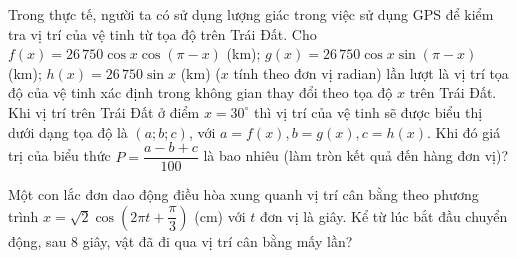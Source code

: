 \begin{bt}%
	Trong thực tế, người ta có sử dụng lượng giác trong việc sử dụng GPS để kiểm tra vị trí của vệ tinh từ tọa độ trên Trái Đất. Cho $ f(x) = 26\,750 \cos x\cos(\pi-x)$ (km); $g(x)=26\,750\cos x\sin(\pi-x)$ (km); $h(x)=26\,750\sin x$ (km) ($x$ tính theo đơn vị radian) lần lượt là vị trí tọa độ của vệ tinh xác định trong không gian thay đổi theo tọa độ $x$ trên Trái Đất. Khi vị trí trên Trái Đất ở điểm $x=30^\circ$ thì vị trí của vệ tinh sẽ được biểu thị dưới dạng tọa độ là $(a;b;c)$, với $a=f(x),b=g(x),c=h(x)$. Khi đó giá trị của biểu thức $P=\dfrac{a-b+c}{100}$ là bao nhiêu (làm tròn kết quả đến hàng đơn vị)?
\end{bt}

\begin{bt}%
	Một con lắc đơn dao động điều hòa xung quanh vị trí cân bằng theo phương trình $x=\sqrt{2}\cos\left(2\pi t+\dfrac{\pi}{3}\right)$ (cm) với $t$ đơn vị là giây. Kể từ lúc bắt đầu chuyển động, sau $8$ giây, vật đã đi qua vị trí cân bằng mấy lần?
\end{bt}

